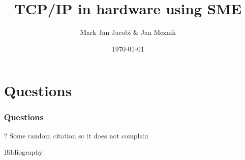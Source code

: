 \documentclass{beamer}
\title{TCP/IP in hardware using SME}
\author{Mark Jan Jacobi \& Jan Meznik}
\institute{KU}
\date{\today}
\begin{document}
\frame{\titlepage}
















\section{Questions}
\begin{frame}
  \frametitle{Questions}
  \begin{center}
    ?
	  Some random citation so it does not complain\cite{sco}
  \end{center}
\end{frame}

\begin{frame}{Bibliography}



\end{frame}



\end{document}
